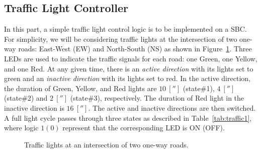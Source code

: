 \subsection{Traffic Light Controller}
\label{sec:voltageDivider}
In this part, a simple traffic light control logic is to be implemented on a SBC. For simplicity, we will be considering traffic lights at the intersection of two one-way roads: East-West (EW) and North-South (NS) as shown in Figure~\ref{fig:intersection1}. Three LEDs are used to indicate the traffic signals for each road: one Green, one Yellow, and  one Red. At any given time, there is an \emph{active direction} with its lights set to green  and an \emph{inactive direction} with its lights set to red. In the active direction, the duration of Green, Yellow, and Red lights are $10~[\second]$ (state\#1), $4~[\second]$ (state\#2) and $2~[\second]$ (state\#3), respectively.  The duration of Red light in the inactive direction is $16~[\second].$ The active and inactive directions are then switched. A full light cycle passes through three states as described in Table~\ref{tab:traffic1}, where logic $1(0)$ represent that the corresponding LED  is ON (OFF). %
%
\begin{figure}
  \centering
  \caption{Traffic lights at an intersection of two one-way roads.}
  \label{fig:intersection1}
\end{figure}

